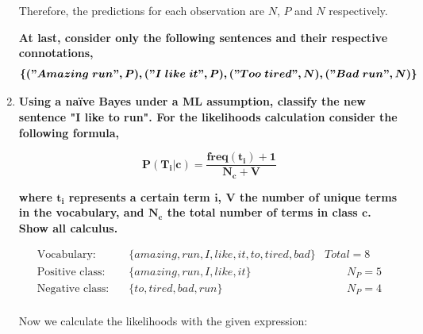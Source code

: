 \documentclass[12pt]{article}
\begin{document}
\begin{enumerate}[leftmargin=\labelsep]
    \vspace{10pt}
    Therefore, the predictions for each observation are $N$, $P$ and $N$ respectively.

    \vspace{10pt}

    \textbf{At last, consider only the following sentences and their respective connotations,}
    \[
    \boldsymbol{\{("Amazing\; run", P), ("I\; like\; it", P), ("Too\; tired", N), ("Bad\; run", N)\}}
    \]

    \item \textbf{Using a naïve Bayes under a ML assumption, classify the new sentence
    "I like to run". For the likelihoods calculation consider the following formula,}

    \begin{equation*}
        \boldsymbol{P(T_i|c) = \frac{freq(t_i) + 1}{N_c + V}}
    \end{equation*}

    \textbf{where $\mathbf{t_i}$ represents a certain term $\mathbf{i}$, $\mathbf{V}$ the number of unique terms in the vocabulary, and
    $\mathbf{N_c}$ the total number of terms in class $\mathbf{c}$. Show all calculus.}

    
    \vspace{10pt}
    \begin{equation*}
        \begin{aligned}
            \text{Vocabulary:} & \quad \{amazing, run, I, like, it, to, tired, bad\} & Total = 8\\
            \text{Positive class:} & \quad \{amazing, run, I, like, it\} &\qquad N_P = 5\\
            \text{Negative class:} & \quad \{to, tired, bad, run\} &\qquad N_P = 4\\
        \end{aligned}
    \end{equation*}

    \vspace{10pt}
    Now we calculate the likelihoods with the given expression:


\end{enumerate}
\end{document}
